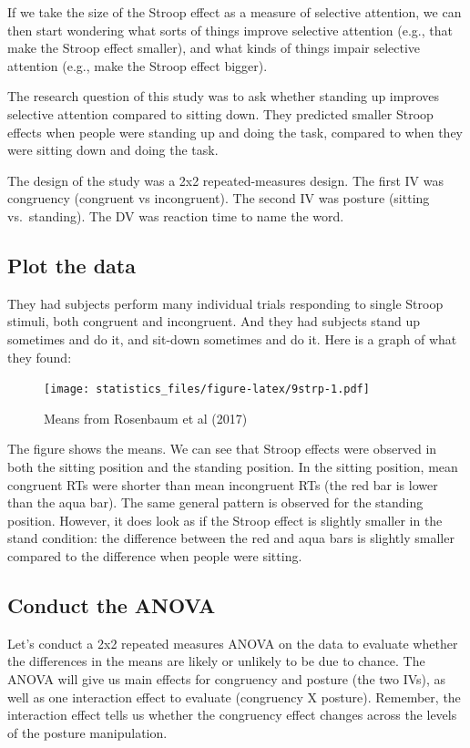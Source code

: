 \documentclass[]{book}
\begin{document}
If we take the size of the Stroop effect as a measure of selective attention, we can then start wondering what sorts of things improve selective attention (e.g., that make the Stroop effect smaller), and what kinds of things impair selective attention (e.g., make the Stroop effect bigger).

The research question of this study was to ask whether standing up improves selective attention compared to sitting down. They predicted smaller Stroop effects when people were standing up and doing the task, compared to when they were sitting down and doing the task.

The design of the study was a 2x2 repeated-measures design. The first IV was congruency (congruent vs incongruent). The second IV was posture (sitting vs.~standing). The DV was reaction time to name the word.

\hypertarget{plot-the-data}{%
\subsection{Plot the data}\label{plot-the-data}}

They had subjects perform many individual trials responding to single Stroop stimuli, both congruent and incongruent. And they had subjects stand up sometimes and do it, and sit-down sometimes and do it. Here is a graph of what they found:

\begin{figure}
\centering
\texttt{[image: statistics\_files/figure-latex/9strp-1.pdf]}
\caption{\label{fig:9strp}Means from Rosenbaum et al (2017)}
\end{figure}

The figure shows the means. We can see that Stroop effects were observed in both the sitting position and the standing position. In the sitting position, mean congruent RTs were shorter than mean incongruent RTs (the red bar is lower than the aqua bar). The same general pattern is observed for the standing position. However, it does look as if the Stroop effect is slightly smaller in the stand condition: the difference between the red and aqua bars is slightly smaller compared to the difference when people were sitting.

\hypertarget{conduct-the-anova}{%
\subsection{Conduct the ANOVA}\label{conduct-the-anova}}

Let's conduct a 2x2 repeated measures ANOVA on the data to evaluate whether the differences in the means are likely or unlikely to be due to chance. The ANOVA will give us main effects for congruency and posture (the two IVs), as well as one interaction effect to evaluate (congruency X posture). Remember, the interaction effect tells us whether the congruency effect changes across the levels of the posture manipulation.
\end{document}
